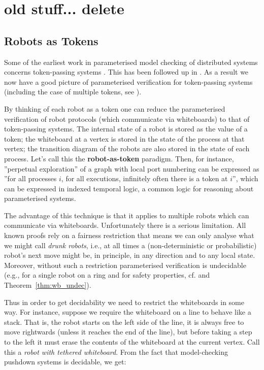 \section{old stuff... delete}
\subsection{Robots as Tokens} \label{sec:token}

Some of the earliest work in parameterised model checking of distributed systems
concerns token-passing systems \cite{Suzuki,EN95popl}.  This has been followed
up in \cite{CTTV04,AJKR14,AKRSV14}. As a result we now have a good picture of
parameterised verification for token-passing systems (including the case of
multiple tokens, see \cite[see conclusion]{AJKR14}).


By thinking of each robot as a token one can reduce the parameterised
verification of robot protocols (which communicate via whiteboards) to that of
token-passing systems. The internal state of a robot is stored as the value of a
token; the whiteboard at a vertex is stored in the state of the process at that
vertex; the transition diagram of the robots are also stored in the state of
each process. Let's call this the {\bf robot-as-token} paradigm. Then, for
instance, ''perpetual exploration'' of a graph with local port numbering can be
expressed as ''for all processes $i$, for all executions, infinitely often there
is a token at $i$'', which can be expressed in indexed temporal logic, a common
logic for reasoning about parameterised systems.

The advantage of this technique is that it applies to multiple robots which can
communicate via whiteboards. Unfortunately there is a serious limitation. All
known proofs rely on a fairness restriction that means we can only analyse what
we might call {\em drunk robots}, i.e., at all times a (non-deterministic or
probabilistic) robot's next move might be, in principle, in any direction and to
any local state. Moreover, without such a restriction parameterised verification
is undecidable (e.g., for a single robot on a ring and for safety properties,
cf. \cite{Suzuki,Emerso03} and Theorem~\ref{thm:wb_undec}).




Thus in order to get decidability we need to restrict the whiteboards in some
way. For instance, suppose we require the whiteboard on a line to behave like a
stack. That is, the robot starts on the left side of the line, it is always free
to move rightwards (unless it reaches the end of the line), but before taking a
step to the left it must erase the contents of the whiteboard at the current
vertex. Call this a {\em robot with tethered whiteboard}. From the fact that
model-checking pushdown systems is decidable, we get:

